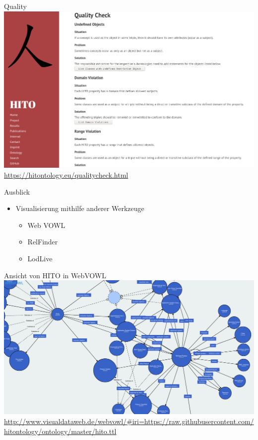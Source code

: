 \documentclass[aspectratio=1610,12pt]{beamer}
\begin{document}
\begin{frame}{Quality}
  \vspace{-0.3cm}
  \centering
  \includegraphics[width=.95\textwidth]{img/qualitychecker.png}
  \footnotesize{\url{https://hitontology.eu/qualitycheck.html}}
\end{frame}

\begin{frame}{Ausblick}
\begin{spacing}{1.5}
\begin{itemize}
  \item Visualisierung mithilfe anderer Werkzeuge
  \begin{itemize}
    \item Web VOWL
    \item RelFinder
    \item LodLive
  \end{itemize}
\end{itemize}
\end{spacing}
\end{frame}

\begin{frame}{Ansicht von HITO in WebVOWL}
  \vspace{-0.3cm}
  \centering
  \includegraphics[width=.95\textwidth]{img/webvowl.png}
  \footnotesize{\url{http://www.visualdataweb.de/webvowl/\#iri=https://raw.githubusercontent.com/hitontology/ontology/master/hito.ttl}}
\end{frame}
\end{document}
